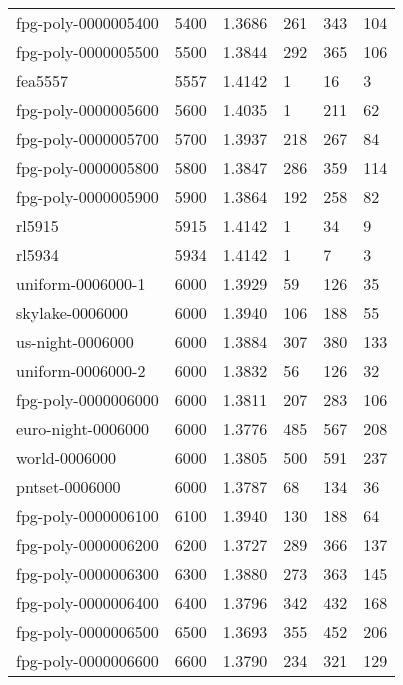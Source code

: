 \begin{longtable}{|lrrlll|}
fpg-poly-0000005400 & 5400 & \num{1.3686} & \num{261} & \num{343} & \num{104} \\
fpg-poly-0000005500 & 5500 & \num{1.3844} & \num{292} & \num{365} & \num{106} \\
fea5557 & 5557 & \num{1.4142} & \num{1} & \num{16} & \num{3} \\
fpg-poly-0000005600 & 5600 & \num{1.4035} & \num{1} & \num{211} & \num{62} \\
fpg-poly-0000005700 & 5700 & \num{1.3937} & \num{218} & \num{267} & \num{84} \\
fpg-poly-0000005800 & 5800 & \num{1.3847} & \num{286} & \num{359} & \num{114} \\
fpg-poly-0000005900 & 5900 & \num{1.3864} & \num{192} & \num{258} & \num{82} \\
rl5915 & 5915 & \num{1.4142} & \num{1} & \num{34} & \num{9} \\
rl5934 & 5934 & \num{1.4142} & \num{1} & \num{7} & \num{3} \\
uniform-0006000-1 & 6000 & \num{1.3929} & \num{59} & \num{126} & \num{35} \\
skylake-0006000 & 6000 & \num{1.3940} & \num{106} & \num{188} & \num{55} \\
us-night-0006000 & 6000 & \num{1.3884} & \num{307} & \num{380} & \num{133} \\
uniform-0006000-2 & 6000 & \num{1.3832} & \num{56} & \num{126} & \num{32} \\
fpg-poly-0000006000 & 6000 & \num{1.3811} & \num{207} & \num{283} & \num{106} \\
euro-night-0006000 & 6000 & \num{1.3776} & \num{485} & \num{567} & \num{208} \\
world-0006000 & 6000 & \num{1.3805} & \num{500} & \num{591} & \num{237} \\
pntset-0006000 & 6000 & \num{1.3787} & \num{68} & \num{134} & \num{36} \\
fpg-poly-0000006100 & 6100 & \num{1.3940} & \num{130} & \num{188} & \num{64} \\
fpg-poly-0000006200 & 6200 & \num{1.3727} & \num{289} & \num{366} & \num{137} \\
fpg-poly-0000006300 & 6300 & \num{1.3880} & \num{273} & \num{363} & \num{145} \\
fpg-poly-0000006400 & 6400 & \num{1.3796} & \num{342} & \num{432} & \num{168} \\
fpg-poly-0000006500 & 6500 & \num{1.3693} & \num{355} & \num{452} & \num{206} \\
fpg-poly-0000006600 & 6600 & \num{1.3790} & \num{234} & \num{321} & \num{129} \\

\end{longtable}

